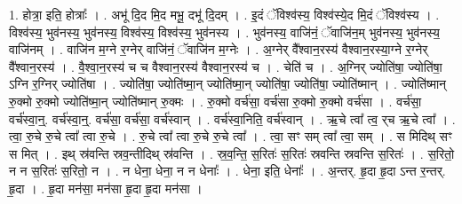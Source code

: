 \documentclass[17pt]{extarticle}
\begin{document}
1. होत्रा॒ इति॒ होत्राः᳚ । . अभू॑ दि॒द मि॒द मभू॒ दभू॑ दि॒दम् । . इ॒दं ॅविश्व॑स्य॒ विश्व॑स्ये॒द मि॒दं ॅविश्व॑स्य । . विश्व॑स्य॒ भुव॑नस्य॒ भुव॑नस्य॒ विश्व॑स्य॒ विश्व॑स्य॒ भुव॑नस्य । . भुव॑नस्य॒ वाजि॑नं॒ ॅवाजि॑न॒म् भुव॑नस्य॒ भुव॑नस्य॒ वाजि॑नम् । . वाजि॑न म॒ग्ने र॒ग्नेर् वाजि॑नं॒ ॅवाजि॑न म॒ग्नेः । . अ॒ग्नेर् वै᳚श्वान॒रस्य॑ वैश्वान॒रस्या॒ग्ने र॒ग्नेर् वै᳚श्वान॒रस्य॑ । . वै॒श्वा॒न॒रस्य॑ च च वैश्वान॒रस्य॑ वैश्वान॒रस्य॑ च । . चेति॑ च । . अ॒ग्निर् ज्योति॑षा॒ ज्योति॑षा॒ ऽग्नि र॒ग्निर् ज्योति॑षा । . ज्योति॑षा॒ ज्योति॑ष्मा॒न् ज्योति॑ष्मा॒न् ज्योति॑षा॒ ज्योति॑षा॒ ज्योति॑ष्मान् । . ज्योति॑ष्मान् रु॒क्मो रु॒क्मो ज्योति॑ष्मा॒न् ज्योति॑ष्मान् रु॒क्मः । . रु॒क्मो वर्च॑सा॒ वर्च॑सा रु॒क्मो रु॒क्मो वर्च॑सा । . वर्च॑सा॒ वर्च॑स्वा॒न्॒. वर्च॑स्वा॒न्॒. वर्च॑सा॒ वर्च॑सा॒ वर्च॑स्वान् । . वर्च॑स्वा॒निति॒ वर्च॑स्वान् । . ऋ॒चे त्वा᳚ त्व॒ र्‌च ऋ॒चे त्वा᳚ । . त्वा॒ रु॒चे रु॒चे त्वा᳚ त्वा रु॒चे । . रु॒चे त्वा᳚ त्वा रु॒चे रु॒चे त्वा᳚ । . त्वा॒ सꣳ सम् त्वा᳚ त्वा॒ सम् । . स मिदिथ् सꣳ स मित् । . इथ् स्र॑वन्ति स्रव॒न्तीदिथ् स्र॑वन्ति । . स्र॒व॒न्ति॒ स॒रितः॑ स॒रितः॑ स्रवन्ति स्रवन्ति स॒रितः॑ । . स॒रितो॒ न न स॒रितः॑ स॒रितो॒ न । . न धेना॒ धेना॒ न न धेनाः᳚ । . धेना॒ इति॒ धेनाः᳚ । . अ॒न्तर्. हृ॒दा हृ॒दा ऽन्त र॒न्तर्. हृ॒दा । . हृ॒दा मन॑सा॒ मन॑सा हृ॒दा हृ॒दा मन॑सा । \newline
\end{document}
